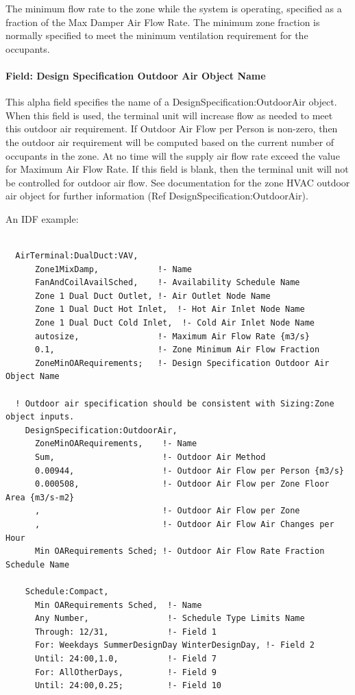 The minimum flow rate to the zone while the system is operating, specified as a fraction of the Max Damper Air Flow Rate. The minimum zone fraction is normally specified to meet the minimum ventilation requirement for the occupants.

\paragraph{Field: Design Specification Outdoor Air Object Name}\label{field-design-specification-outdoor-air-object-name-2}

This alpha field specifies the name of a DesignSpecification:OutdoorAir object. When this field is used, the terminal unit will increase flow as needed to meet this outdoor air requirement. If Outdoor Air Flow per Person is non-zero, then the outdoor air requirement will be computed based on the current number of occupants in the zone. At no time will the supply air flow rate exceed the value for Maximum Air Flow Rate. If this field is blank, then the terminal unit will not be controlled for outdoor air flow. See documentation for the zone HVAC outdoor air object for further information (Ref DesignSpecification:OutdoorAir).

An IDF example:

\begin{lstlisting}

  AirTerminal:DualDuct:VAV,
      Zone1MixDamp,            !- Name
      FanAndCoilAvailSched,    !- Availability Schedule Name
      Zone 1 Dual Duct Outlet, !- Air Outlet Node Name
      Zone 1 Dual Duct Hot Inlet,  !- Hot Air Inlet Node Name
      Zone 1 Dual Duct Cold Inlet,  !- Cold Air Inlet Node Name
      autosize,                !- Maximum Air Flow Rate {m3/s}
      0.1,                     !- Zone Minimum Air Flow Fraction
      ZoneMinOARequirements;   !- Design Specification Outdoor Air Object Name

  ! Outdoor air specification should be consistent with Sizing:Zone object inputs.
    DesignSpecification:OutdoorAir,
      ZoneMinOARequirements,    !- Name
      Sum,                      !- Outdoor Air Method
      0.00944,                  !- Outdoor Air Flow per Person {m3/s}
      0.000508,                 !- Outdoor Air Flow per Zone Floor Area {m3/s-m2}
      ,                         !- Outdoor Air Flow per Zone
      ,                         !- Outdoor Air Flow Air Changes per Hour
      Min OARequirements Sched; !- Outdoor Air Flow Rate Fraction Schedule Name

    Schedule:Compact,
      Min OARequirements Sched,  !- Name
      Any Number,                !- Schedule Type Limits Name
      Through: 12/31,            !- Field 1
      For: Weekdays SummerDesignDay WinterDesignDay, !- Field 2
      Until: 24:00,1.0,          !- Field 7
      For: AllOtherDays,         !- Field 9
      Until: 24:00,0.25;         !- Field 10
\end{lstlisting}

